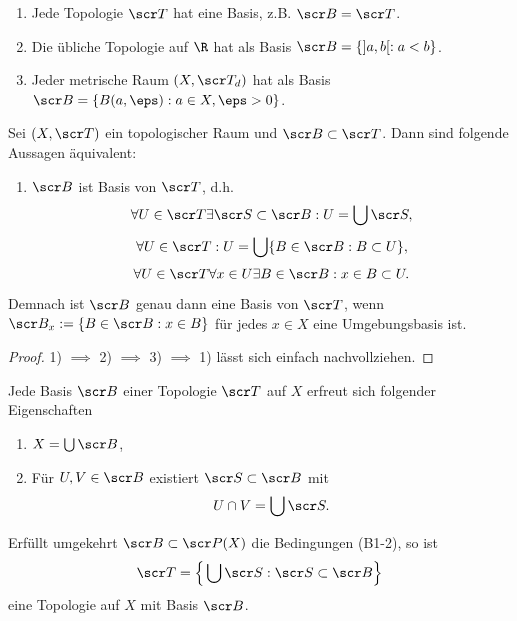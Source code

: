 \begin{ex}
	\begin{enumerate}[1)]
		\item
			Jede Topologie $\scr T$ hat eine Basis, z.B. $\scr B = \scr T$.
		\item
			Die übliche Topologie auf $\R$ hat als Basis $\scr B = \{ ]a,b[ : a < b \}$.
		\item
			Jeder metrische Raum $(X, \scr T_d)$ hat als Basis $\scr B = \{ B(a, \eps) : a \in X, \eps > 0 \}$.
	\end{enumerate}
\end{ex}


\begin{prop}
	Sei $(X, \scr T)$ ein topologischer Raum und $\scr B \subset \scr T$.
	Dann sind folgende Aussagen äquivalent:
	\begin{enumerate}[1)]
		\item
			$\scr B$ ist Basis von $\scr T$, d.h.
			\[
				\forall U \in \scr T \exists \scr S \subset \scr B : U = \bigcup \scr S,
			\]
		\itemdm
			\[
				\forall U \in \scr T : U = \bigcup \{ B \in \scr B : B \subset U \},
			\]
		\itemdm
			\[
				\forall U \in \scr T \forall x \in U \exists B \in \scr B : x \in B \subset U.
			\]
	\end{enumerate}
	Demnach ist $\scr B$ genau dann eine Basis von $\scr T$, wenn $\scr B_x := \{ B \in \scr B : x \in B \}$ für jedes $x \in X$ eine Umgebungsbasis ist.
	\begin{proof}
		1) $\implies$ 2) $\implies$ 3) $\implies$ 1) lässt sich einfach nachvollziehen.
	\end{proof}
\end{prop}

\begin{st}
	Jede Basis $\scr B$ einer Topologie $\scr T$ auf $X$ erfreut sich folgender Eigenschaften
	\begin{enumerate}[(B1),leftmargin=*]
		\item
			$X = \bigcup \scr B$,
		\item
			Für $U, V \in \scr B$ existiert $\scr S \subset \scr B$ mit
			\[
				U \cap V = \bigcup \scr S.
			\]
	\end{enumerate}

	Erfüllt umgekehrt $\scr B \subset \scr P(X)$ die Bedingungen (B1-2), so ist
	\[
		\scr T = \Big\{ \bigcup \scr S : \scr S \subset \scr B \Big\}
	\]
	eine Topologie auf $X$ mit Basis $\scr B$.
\end{st}

